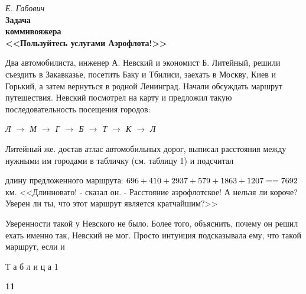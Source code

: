 \begin{multicols}{2}

\noindent
\textit{Е. Габович} \\

\noindent
\huge
\textbf{Задача \\коммивояжера}\\

\footnotesize
\noindent
\textbf{<<Пользуйтесь услугами Аэрофлота!>>}

\normalsize
\noindent
Два автомобилиста, инженер А. Невский и экономист Б. Литейный, решили съездить в Закавказье, посетить Баку и Тбилиси, заехать в Москву, Киев и Горький, а затем вернуться в родной Ленинград. Начали обсуждать маршрут путешествия. Невский посмотрел на карту и предложил такую последовательность посещения городов:

\textit{Л $\rightarrow$ М $\rightarrow$ Г $\rightarrow$ Б $\rightarrow$ Т $\rightarrow$ К $\rightarrow$ Л}

\noindent
Литейный же. достав атлас автомобильных дорог, выписал расстояния между нужными им городами в табличку (см. таблицу 1) и подсчитал 

\vfill\null
\columnbreak

\noindent
длину предложенного маршрута: $696+410+2937+579+1863+1207= \linebreak
=7692$ км. <<Длинновато! - сказал \linebreak
он. - Расстояние аэрофлотское! А нельзя ли короче? Уверен ли ты, что этот маршрут является кратчайшим?>>

Уверенности такой у Невского не было. Более того, объяснить, почему он решил ехать именно так, Невский не мог. Просто интуиция подсказывала ему, что такой маршрут, если и

\begin{flushright}
\footnotesize
    Т а б л и ц а 1
\end{flushright}

\noindent
{}

\begin{flushright}
    \vfill\null
    \textbf{11}
\end{flushright}

\end{multicols}